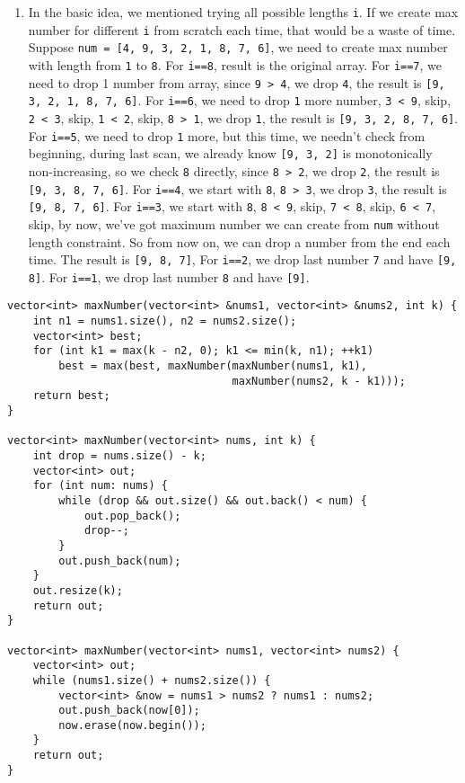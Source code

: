 \documentclass[11pt]{article}
\begin{document}
\begin{enumerate}
\item In the basic idea, we mentioned trying all possible lengths \texttt{i}. If we create max number for different \texttt{i} from scratch each time, that would be a waste of time. Suppose \texttt{num = [4, 9, 3, 2, 1, 8, 7, 6]}, we need to create max number with length from \texttt{1} to \texttt{8}. For \texttt{i==8}, result is the original array. For \texttt{i==7}, we need to drop 1 number from array, since \texttt{9 > 4}, we drop \texttt{4}, the result is \texttt{[9, 3, 2, 1, 8, 7, 6]}. For \texttt{i==6}, we need to drop \texttt{1} more number, \texttt{3 < 9}, skip, \texttt{2 < 3}, skip, \texttt{1 < 2}, skip, \texttt{8 > 1}, we drop \texttt{1}, the result is \texttt{[9, 3, 2, 8, 7, 6]}. For \texttt{i==5}, we need to drop \texttt{1} more, but this time, we needn't check from beginning, during last scan, we already know \texttt{[9, 3, 2]} is monotonically non-increasing, so we check \texttt{8} directly, since \texttt{8 > 2}, we drop \texttt{2}, the result is \texttt{[9, 3, 8, 7, 6]}. For \texttt{i==4}, we start with \texttt{8}, \texttt{8 > 3}, we drop \texttt{3}, the result is \texttt{[9, 8, 7, 6]}. For \texttt{i==3}, we start with \texttt{8}, \texttt{8 < 9}, skip, \texttt{7 < 8}, skip, \texttt{6 < 7}, skip, by now, we've got maximum number we can create from \texttt{num} without length constraint. So from now on, we can drop a number from the end each time. The result is \texttt{[9, 8, 7]}, For \texttt{i==2}, we drop last number \texttt{7} and have \texttt{[9, 8]}. For \texttt{i==1}, we drop last number \texttt{8} and have \texttt{[9]}.
\end{enumerate}

\begin{verbatim}
vector<int> maxNumber(vector<int> &nums1, vector<int> &nums2, int k) {
    int n1 = nums1.size(), n2 = nums2.size();
    vector<int> best;
    for (int k1 = max(k - n2, 0); k1 <= min(k, n1); ++k1)
        best = max(best, maxNumber(maxNumber(nums1, k1),
                                   maxNumber(nums2, k - k1)));
    return best;
}

vector<int> maxNumber(vector<int> nums, int k) {
    int drop = nums.size() - k;
    vector<int> out;
    for (int num: nums) {
        while (drop && out.size() && out.back() < num) {
            out.pop_back();
            drop--;
        }
        out.push_back(num);
    }
    out.resize(k);
    return out;
}

vector<int> maxNumber(vector<int> nums1, vector<int> nums2) {
    vector<int> out;
    while (nums1.size() + nums2.size()) {
        vector<int> &now = nums1 > nums2 ? nums1 : nums2;
        out.push_back(now[0]);
        now.erase(now.begin());
    }
    return out;
}
\end{verbatim}
\end{document}
